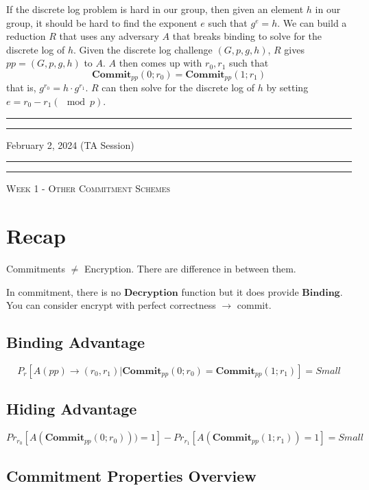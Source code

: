 \documentclass{article}
\begin{document}
If the discrete log problem is hard in our group, then given an element $h$ in our group, it should be hard to find the exponent $e$ such that $g^e = h$. We can build a reduction $R$ that uses any adversary $A$ that breaks binding to solve for the discrete log of $h$. Given the discrete log challenge $(G, p, g, h)$, $R$ gives $pp = (G, p, g, h)$ to $A$. $A$ then comes up with $r_0, r_1$ such that
$$\mathbf{Commit}_{pp}(0; r_0) = \mathbf{Commit}_{pp}(1; r_1)$$
that is, $g^{r_0} =h \cdot g^{r_1}$. $R$ can then solve for the discrete log of $h$ by setting $e=r_0−r_1 (\mod p)$.

\pagebreak

\hrule
\hrule
\vspace{0.2cm}
\begin{center}
    February 2, 2024 (TA Session)
\end{center}
\vspace{0.3cm}
\hrule
\hrule
\begin{center}
    \textsc{Week 1 - Other Commitment Schemes}
\end{center}

\section{Recap}

Commitments $\neq$ Encryption. There are difference in between them.

In commitment, there is no $\mathbf{Decryption}$ function but it does provide $\mathbf{Binding}$. You can consider encrypt with perfect correctness $\rightarrow$ commit.

\subsection{Binding Advantage}\label{binding-advantage}
$$
P_r[A(pp) \rightarrow (r_0, r_1) | \mathbf{Commit}_{pp}(0;r_0) = \mathbf{Commit}_{pp}(1;r_1)] = Small
$$
\subsection{Hiding Advantage}\label{hiding-advantage}
$$
Pr_{r_0} [A(\mathbf{Commit}_{pp}(0;r_0))) = 1] - Pr_{r_1} [A(\mathbf{Commit}_{pp}(1;r_1)) = 1] = Small
$$

\subsection{Commitment Properties Overview}
\end{document}
